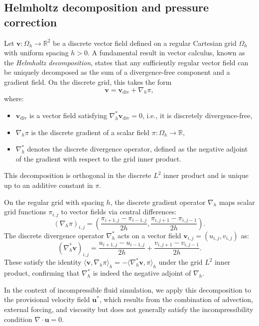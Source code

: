 \documentclass[11pt]{article}
\begin{document}
\subsection*{Helmholtz decomposition and pressure correction}

Let $\bm{v} : \Omega_h \to \mathbb{R}^2$ be a discrete vector field defined on a regular Cartesian grid $\Omega_h$ with uniform spacing $h > 0$. A fundamental result in vector calculus, known as the \emph{Helmholtz decomposition}, states that any sufficiently regular vector field can be uniquely decomposed as the sum of a divergence-free component and a gradient field. On the discrete grid, this takes the form
\begin{equation}\label{eq:helmholtz}
  \bm{v} = \bm{v}_{\mathrm{div}} + \nabla_h \pi,
\end{equation}
where:
\begin{itemize}
  \item $\bm{v}_{\mathrm{div}}$ is a vector field satisfying $\nabla_h^{*} \bm{v}_{\mathrm{div}} = 0$, i.e., it is discretely divergence-free,
  \item $\nabla_h \pi$ is the discrete gradient of a scalar field $\pi : \Omega_h \to \mathbb{R}$,
  \item $\nabla_h^{*}$ denotes the discrete divergence operator, defined as the negative adjoint of the gradient with respect to the grid inner product.
\end{itemize}

This decomposition is orthogonal in the discrete $L^2$ inner product and is unique up to an additive constant in $\pi$.

On the regular grid with spacing $h$, the discrete gradient operator $\nabla_h$ maps scalar grid functions $\pi_{i,j}$ to vector fields via central differences:
\[
(\nabla_h \pi)_{i,j} =
\left( \frac{\pi_{i+1,j} - \pi_{i-1,j}}{2h},
       \frac{\pi_{i,j+1} - \pi_{i,j-1}}{2h} \right).
\]
The discrete divergence operator $\nabla_h^{*}$ acts on a vector field $\bm{v}_{i,j} = (u_{i,j}, v_{i,j})$ as:
\[
(\nabla_h^{*} \bm{v})_{i,j} =
\frac{u_{i+1,j} - u_{i-1,j}}{2h}
+ \frac{v_{i,j+1} - v_{i,j-1}}{2h}.
\]
These satisfy the identity $\langle \bm{v}, \nabla_h \pi \rangle_h = -\langle \nabla_h^* \bm{v}, \pi \rangle_h$ under the grid $L^2$ inner product, confirming that $\nabla_h^*$ is indeed the negative adjoint of $\nabla_h$.



\medskip

In the context of incompressible fluid simulation, we apply this decomposition to the provisional velocity field $\bm{u}^\ast$, which results from the combination of advection, external forcing, and viscosity but does not generally satisfy the incompressibility condition $\nabla \cdot \bm{u} = 0$.
\end{document}
